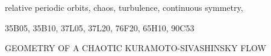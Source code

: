\documentclass{siamltex}          %
\begin{document}
\begin{keywords}
relative periodic orbits, chaos, turbulence, continuous symmetry, {\KSe}
\end{keywords}

\begin{AMS}
35B05, 35B10, 37L05, 37L20, 76F20, 65H10, 90C53
\end{AMS}

\pagestyle{myheadings}
\thispagestyle{plain}
         {GEOMETRY OF A CHAOTIC KURAMOTO-SIVASHINSKY FLOW}








\appendix






\end{document}

